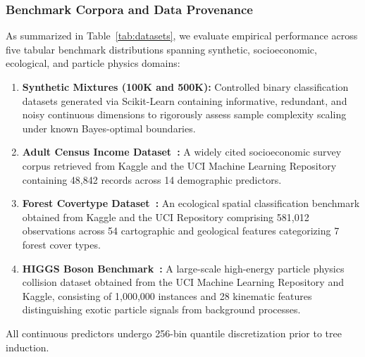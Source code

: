 \subsubsection{Benchmark Corpora and Data Provenance}
As summarized in Table~\ref{tab:datasets}, we evaluate empirical performance across five tabular benchmark distributions spanning synthetic, socioeconomic, ecological, and particle physics domains:
\begin{enumerate}
    \item \textbf{Synthetic Mixtures (100K and 500K):} Controlled binary classification datasets generated via Scikit-Learn containing informative, redundant, and noisy continuous dimensions to rigorously assess sample complexity scaling under known Bayes-optimal boundaries.
    \item \textbf{Adult Census Income Dataset~\cite{kaggle_adult}:} A widely cited socioeconomic survey corpus retrieved from Kaggle and the UCI Machine Learning Repository containing 48,842 records across 14 demographic predictors.
    \item \textbf{Forest Covertype Dataset~\cite{kaggle_covertype}:} An ecological spatial classification benchmark obtained from Kaggle and the UCI Repository comprising 581,012 observations across 54 cartographic and geological features categorizing 7 forest cover types.
    \item \textbf{HIGGS Boson Benchmark~\cite{baldi2014searching}:} A large-scale high-energy particle physics collision dataset obtained from the UCI Machine Learning Repository and Kaggle, consisting of 1,000,000 instances and 28 kinematic features distinguishing exotic particle signals from background processes.
\end{enumerate}
All continuous predictors undergo 256-bin quantile discretization prior to tree induction.

